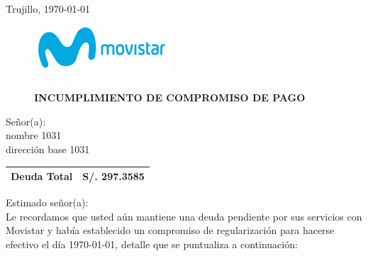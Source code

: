 %
%

\begin{flushright}
    Trujillo, \today
\end{flushright}
\vspace{-0.5cm}

\begin{figure}[h]
\begin{minipage}[b]{5.106458333cm}
\includegraphics[natwidth=5.106458333cm, natheight=1.931458333cm]{resources/business_logo.png}
\end{minipage}
\begin{minipage}[b][1.9314cm][t]{11cm}
\begin{flushright}
{\LARGE \bf INCUMPLIMIENTO DE COMPROMISO DE PAGO}
\end{flushright}
\end{minipage}
\end{figure}

\noindent
Señor(a):\\
nombre 1031\\
dirección base 1031

\begin{flushright}
\bf \large
\begin{tabular}{|p{3.2cm} p{3.2cm}|}
\hline
Deuda Total & S/. 297.3585 \\
\hline
\end{tabular}
\end{flushright}

\noindent
Estimado señor(a):\\
Le recordamos que usted aún mantiene una deuda pendiente por sus servicios con Movistar y había establecido un compromiso de regularización para hacerse efectivo el día \monthyeardate\today, detalle que se puntualiza a continuación:

